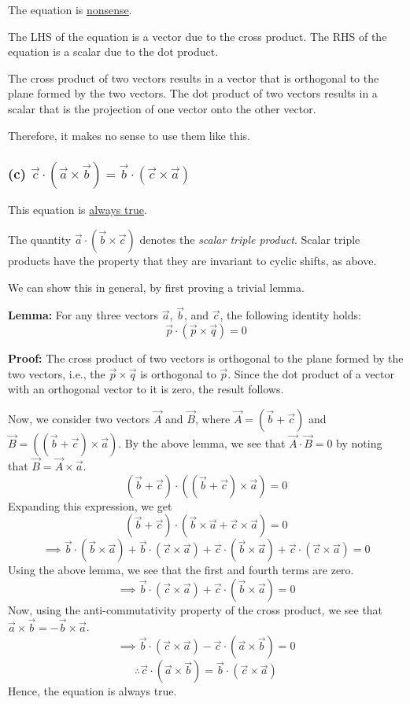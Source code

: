 The equation is \underline{nonsense}.

The LHS of the equation is a vector due to the cross product.
The RHS of the equation is a scalar due to the dot product.

The cross product of two vectors results in a vector that is orthogonal to the plane formed by the two vectors.
The dot product of two vectors results in a scalar that is the projection of one vector onto the other vector.

Therefore, it makes no sense to use them like this.

\subsubsection*{(c) \( \vec{c} \cdot (\vec{a} \times \vec{b}) = \vec{b} \cdot (\vec{c} \times \vec{a}) \)}

This equation is \underline{always true}.

The quantity \( \vec{a} \cdot (\vec{b} \times \vec{c}) \) denotes the \textit{scalar triple product}.
Scalar triple products have the property that they are invariant to cyclic shifts, as above.

We can show this in general, by first proving a trivial lemma.

\textbf{Lemma:} For any three vectors \( \vec{a} \), \( \vec{b} \), and \( \vec{c} \), the following identity holds:
\begin{equation*}
    \vec{p} \cdot (\vec{p} \times \vec{q}) = 0
\end{equation*}

\textbf{Proof:}
The cross product of two vectors is orthogonal to the plane formed by the two vectors, i.e., the \( \vec{p} \times \vec{q} \) is orthogonal to \( \vec{p} \).
Since the dot product of a vector with an orthogonal vector to it is zero, the result follows.

Now, we consider two vectors \( \vec{A} \) and \( \vec{B} \), where \( \vec{A} = (\vec{b} + \vec{c}) \) and \( \vec{B} = ((\vec{b} + \vec{c}) \times \vec{a}) \).
By the above lemma, we see that \( \vec{A} \cdot \vec{B} = 0 \) by noting that \( \vec{B} = \vec{A} \times \vec{a} \).
\begin{equation*}
    (\vec{b} + \vec{c}) \cdot ((\vec{b} + \vec{c}) \times \vec{a}) = 0
\end{equation*}
Expanding this expression, we get
\[
    (\vec{b} + \vec{c}) \cdot (\vec{b} \times \vec{a} + \vec{c} \times \vec{a}) = 0
\]
\[
    \implies \vec{b} \cdot (\vec{b} \times \vec{a}) + \vec{b} \cdot (\vec{c} \times \vec{a}) + \vec{c} \cdot (\vec{b} \times \vec{a}) + \vec{c} \cdot (\vec{c} \times \vec{a}) = 0
\]
Using the above lemma, we see that the first and fourth terms are zero.
\[
    \implies \vec{b} \cdot (\vec{c} \times \vec{a}) + \vec{c} \cdot (\vec{b} \times \vec{a}) = 0
\]
Now, using the anti-commutativity property of the cross product, we see that \( \vec{a} \times \vec{b} = -\vec{b} \times \vec{a} \).
\[
    \implies \vec{b} \cdot (\vec{c} \times \vec{a}) - \vec{c} \cdot (\vec{a} \times \vec{b}) = 0
\]
\[
    \therefore \vec{c} \cdot (\vec{a} \times \vec{b}) = \vec{b} \cdot (\vec{c} \times \vec{a})
\]
Hence, the equation is always true.

